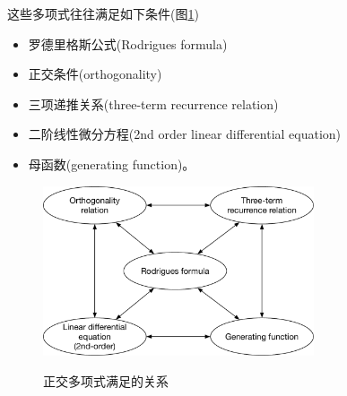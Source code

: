 \begin{subappendices}
这些多项式往往满足如下条件(图\ref{fig:poly-classical-relations})
\begin{itemize}
  \item 罗德里格斯公式(Rodrigues formula)
  \item 正交条件(orthogonality)
  \item 三项递推关系(three-term recurrence relation)
  \item 二阶线性微分方程(2nd order linear differential equation)
  \item 母函数(generating function)。
\end{itemize}
\begin{figure}[htbp]
   \caption{正交多项式满足的关系}
  \centering
  \includegraphics[width=8cm]{./Figures/20170905-poly-types-formulas}
  \label{fig:poly-classical-relations}
%
\end{figure}


\end{subappendices}
